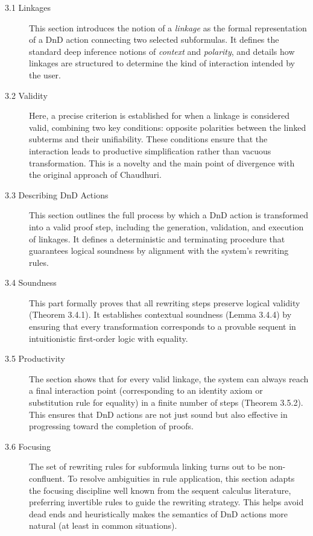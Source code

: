 \documentclass[11pt]{article}
\begin{document}
\begin{description}
\item[3.1 Linkages]
This section introduces the notion of a \emph{linkage} as the formal representation of a DnD action connecting two selected subformulas. It defines the standard deep inference notions of \emph{context} and \emph{polarity}, and details how linkages are structured to determine the kind of interaction intended by the user.

\item[3.2 Validity]
Here, a precise criterion is established for when a linkage is considered valid, combining two key conditions: opposite polarities between the linked subterms and their unifiability. These conditions ensure that the interaction leads to productive simplification rather than vacuous transformation. This is a novelty and the main point of divergence with the original approach of Chaudhuri.

\item[3.3 Describing DnD Actions]
This section outlines the full process by which a DnD action is transformed into a valid proof step, including the generation, validation, and execution of linkages. It defines a deterministic and terminating procedure that guarantees logical soundness by alignment with the system's rewriting rules.

\item[3.4 Soundness]
This part formally proves that all rewriting steps preserve logical validity (Theorem 3.4.1). It establishes contextual soundness (Lemma 3.4.4) by ensuring that every transformation corresponds to a provable sequent in intuitionistic first-order logic with equality.

\item[3.5 Productivity]
The section shows that for every valid linkage, the system can always reach a final interaction point (corresponding to an identity axiom or substitution rule for equality) in a finite number of steps (Theorem 3.5.2). This ensures that DnD actions are not just sound but also effective in progressing toward the completion of proofs.

\item[3.6 Focusing]
The set of rewriting rules for subformula linking turns out to be non-confluent. To resolve ambiguities in rule application, this section adapts the focusing discipline well known from the sequent calculus literature, preferring invertible rules to guide the rewriting strategy. This helps avoid dead ends and heuristically makes the semantics of DnD actions more natural (at least in common situations).


\end{description}
\end{document}

